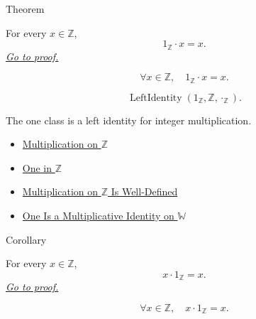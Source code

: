 \begin{theorembox}{Theorem}
\begin{theorem}
\label{thm:one-left-multiplicative-identity-on-z}
For every $x\in\mathbb{Z}$,
\[
1_{\mathbb{Z}}\cdot x=x.
\]
\hyperref[prf:one-left-multiplicative-identity-on-z]{\textit{Go to proof.}}
\end{theorem}
\end{theorembox}

\begin{remark*}
\[
\forall x\in\mathbb{Z},\quad 1_{\mathbb{Z}}\cdot x=x.
\]
\end{remark*}

\begin{remark*}
\[
\operatorname{LeftIdentity}(1_{\mathbb{Z}},\mathbb{Z},\cdot_{\mathbb{Z}}).
\]
\end{remark*}

\begin{remark*}[Interpretation]
The one class is a left identity for integer multiplication.
\end{remark*}

\begin{dependencies}
\begin{itemize}
  \item \hyperref[def:multiplication-on-z-classes]{Multiplication on $\mathbb{Z}$}
  \item \hyperref[def:one-in-z]{One in $\mathbb{Z}$}
  \item \hyperref[thm:multiplication-on-z-well-defined]{Multiplication on $\mathbb{Z}$ Is Well-Defined}
  \item \hyperref[thm:one-multiplicative-identity-on-w]{One Is a Multiplicative Identity on $\mathbb{W}$}
\end{itemize}
\end{dependencies}

\begin{corollarybox}{Corollary}
\begin{corollary}
\label{cor:one-right-multiplicative-identity-on-z}
For every $x\in\mathbb{Z}$,
\[
x\cdot 1_{\mathbb{Z}}=x.
\]
\hyperref[prf:one-right-multiplicative-identity-on-z]{\textit{Go to proof.}}
\end{corollary}
\end{corollarybox}

\begin{remark*}
\[
\forall x\in\mathbb{Z},\quad x\cdot 1_{\mathbb{Z}}=x.
\]
\end{remark*}

